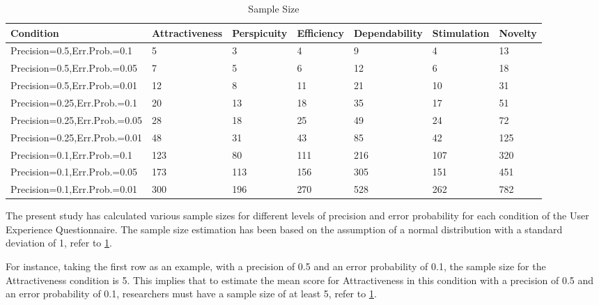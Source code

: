 \documentclass[conference,onecolumn]{IEEEtran}
\begin{document}
            \begin{table}[H]	
                \begin{center}
                    \begin{tabular}[H]{ |m{4cm}|m{2cm}|m{2cm}|m{2cm}|m{2cm}|m{2cm}|m{1cm}|}
                        \hline
                        \textbf{Condition}&\textbf{Attractiveness} &\textbf{Perspicuity} &\textbf{Efficiency}  &\textbf{Dependability}  &\textbf{Stimulation} &\textbf{Novelty}\\ \hline
                        Precision=0.5,Err.Prob.=0.1	    &5	    &3	    &4	    &9	    &4	    &13   \\ \hline  
                        Precision=0.5,Err.Prob.=0.05	&7	    &5	    &6	    &12	    &6	    &18   \\ \hline  
                        Precision=0.5,Err.Prob.=0.01	&12	    &8	    &11	    &21	    &10	    &31   \\ \hline  
                        Precision=0.25,Err.Prob.=0.1	&20	    &13	    &18	    &35	    &17	    &51   \\ \hline  
                        Precision=0.25,Err.Prob.=0.05	&28	    &18	    &25	    &49	    &24	    &72   \\ \hline  
                        Precision=0.25,Err.Prob.=0.01	&48	    &31	    &43	    &85	    &42	    &125  \\ \hline      
                        Precision=0.1,Err.Prob.=0.1	    &123	&80	    &111	&216	&107	&320  \\ \hline      
                        Precision=0.1,Err.Prob.=0.05	&173	&113	&156	&305	&151	&451  \\ \hline      
                        Precision=0.1,Err.Prob.=0.01	&300	&196	&270	&528	&262	&782  \\         
                        \hline
                    \end{tabular}
                \end{center}
                \caption{Sample Size}
                \label{Sample Size}
            \end{table}

            The present study has calculated various sample sizes for different levels of precision and error probability for each condition of the User Experience Questionnaire. The sample size estimation has been based on the assumption of a normal distribution with a standard deviation of 1, refer to \tablename{ \ref{Sample Size}}.

            For instance, taking the first row as an example, with a precision of 0.5 and an error probability of 0.1, the sample size for the Attractiveness condition is 5. This implies that to estimate the mean score for Attractiveness in this condition with a precision of 0.5 and an error probability of 0.1, researchers must have a sample size of at least 5, refer to \tablename{ \ref{Sample Size}}.
\end{document}
